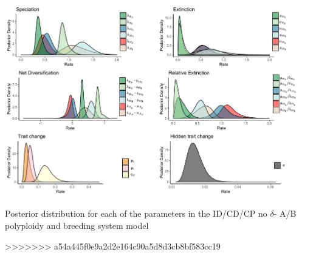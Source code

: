 \begin{suppfigure}
\includegraphics[width=\textwidth]{muhisseDPSInodipposteriordist.pdf}
\caption{Posterior distribution for each of the parameters in the ID/CD/CP no $\delta$- A/B polyploidy and breeding system model} %
\label{suppfigure:IDCDCPnodipAB}
\end{suppfigure}

>>>>>>> a54a445f0e9a2d2e164c90a5d8d3cb8bf583cc19
